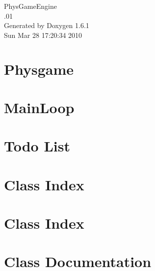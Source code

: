 \documentclass[a4paper]{book}
\begin{document}
\hypersetup{pageanchor=false}
\begin{titlepage}
\vspace*{7cm}
\begin{center}
{\Large PhysGameEngine \\[1ex]\large .01 }\\
\vspace*{1cm}
{\large Generated by Doxygen 1.6.1}\\
\vspace*{0.5cm}
{\small Sun Mar 28 17:20:34 2010}\\
\end{center}
\end{titlepage}
\clearemptydoublepage
{}
\tableofcontents
\clearemptydoublepage
{}
\hypersetup{pageanchor=true}
\chapter{Physgame}
\label{index}\hypertarget{index}{}
\chapter{MainLoop}
\label{MainLoop}
\hypertarget{MainLoop}{}

\chapter{Todo List}
\label{todo}
\hypertarget{todo}{}

\chapter{Class Index}

\chapter{Class Index}

\chapter{Class Documentation}














\printindex
\end{document}
